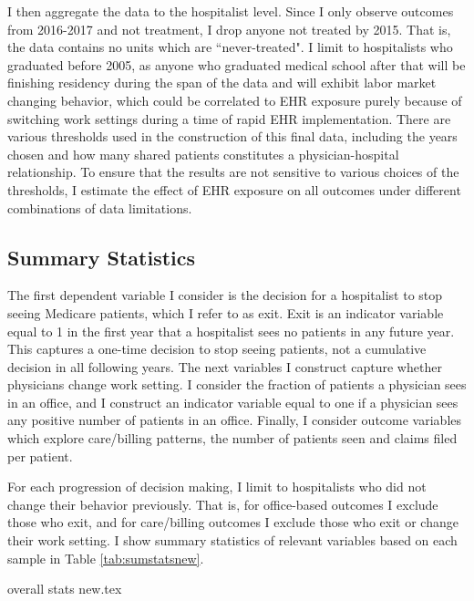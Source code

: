 \documentclass[12pt]{article}
\begin{document}
I then aggregate the data to the hospitalist level. Since I only observe outcomes from 2016-2017 and not treatment, I drop anyone not treated by 2015. That is, the data contains no units which are ``never-treated". I limit to hospitalists who graduated before 2005, as anyone who graduated medical school after that will be finishing residency during the span of the data and will exhibit labor market changing behavior, which could be correlated to EHR exposure purely because of switching work settings during a time of rapid EHR implementation. There are various thresholds used in the construction of this final data, including the years chosen and how many shared patients constitutes a physician-hospital relationship. To ensure that the results  are not sensitive to various choices of the thresholds, I estimate the effect of EHR exposure on all outcomes under different combinations of data limitations. 


\subsection{Summary Statistics}

The first dependent variable I consider is the decision for a hospitalist to stop seeing Medicare patients, which I refer to as exit. Exit is an indicator variable equal to 1 in the first year that a hospitalist sees no patients in any future year. This captures a one-time decision to stop seeing patients, not a cumulative decision in all following years. The next variables I construct capture whether physicians change work setting. I consider the fraction of patients a physician sees in an office, and I construct an indicator variable equal to one if a physician sees any positive number of patients in an office. Finally, I consider outcome variables which explore care/billing patterns, the number of patients seen and claims filed per patient.

For each progression of decision making, I limit to hospitalists who did not change their behavior previously. That is, for office-based outcomes I exclude those who exit, and for care/billing outcomes I exclude those who exit or change their work setting. I show summary statistics of relevant variables based on each sample in Table \ref{tab:sumstatsnew}. 

{overall stats new.tex}
\end{document}

